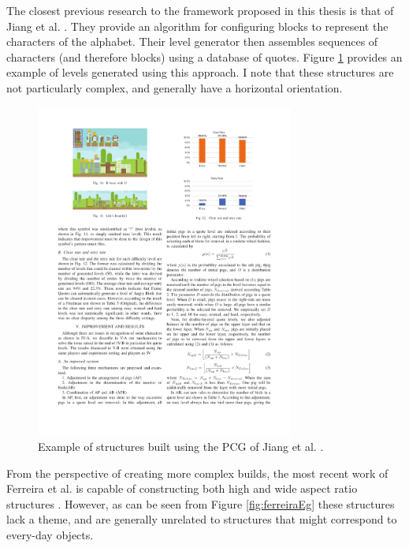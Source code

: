 \documentclass{dalthesis}
\begin{document}
The closest previous research to the framework proposed in this thesis is that of Jiang et al. \cite{jiang17}. They provide an algorithm for configuring blocks to represent the characters of the alphabet. Their level generator then assembles sequences of characters (and therefore blocks) using a database of quotes. Figure \ref{fig:jiangEg} provides an example of levels generated using this approach. I note that these structures are not particularly complex, and generally have a horizontal orientation.

\begin{figure}
\begin{center}
	\includegraphics[width=8.5cm]{./Jiang.pdf}
\caption{Example of structures built using the PCG of Jiang et al. \cite{jiang17}.}
\label{fig:jiangEg}
\end{center}
\end{figure}

From the perspective of creating more complex builds, the most recent work of Ferreira et al. is capable of constructing both high and wide aspect ratio structures \cite{ferreira18}. However, as can be seen from Figure \ref{fig:ferreiraEg} these structures lack a theme, and are generally unrelated to structures that might correspond to every-day objects.
\end{document}
